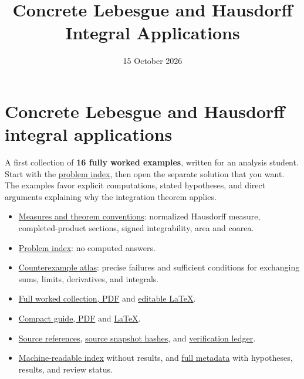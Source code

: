 \documentclass[
  11pt,
]{article}
\title{Concrete Lebesgue and Hausdorff Integral Applications}
\author{}
\date{15 October 2026}
\providecommand{\tightlist}{%
  \setlength{\itemsep}{0pt}\setlength{\parskip}{0pt}}
\begin{document}
\maketitle

{
\hypersetup{linkcolor=}
\setcounter{tocdepth}{3}
\tableofcontents
}
\section{Concrete Lebesgue and Hausdorff integral
applications}\label{start}

A first collection of \textbf{16 fully worked examples}, written for an
analysis student. Start with the \hyperref[problems]{problem index},
then open the separate solution that you want. The examples favor
explicit computations, stated hypotheses, and direct arguments
explaining why the integration theorem applies.

\begin{itemize}
\tightlist
\item
  \hyperref[conventions]{Measures and theorem conventions}: normalized
  Hausdorff measure, completed-product sections, signed integrability,
  area and coarea.
\item
  \hyperref[problems]{Problem index}: no computed answers.
\item
  \hyperref[atlas]{Counterexample atlas}: precise failures and
  sufficient conditions for exchanging sums, limits, derivatives, and
  integrals.
\item
  \href{https://github.com/Drsunflowerherbert/Codex-for-Math/tree/codex/integral-examples-2026-10-15/integral-examples/pdf/integral-examples.pdf}{Full
  worked collection, PDF} and
  \href{https://github.com/Drsunflowerherbert/Codex-for-Math/tree/codex/integral-examples-2026-10-15/integral-examples/pdf/integral-examples.tex}{editable
  LaTeX}.
\item
  \href{https://github.com/Drsunflowerherbert/Codex-for-Math/tree/codex/integral-examples-2026-10-15/integral-examples/pdf/guide.pdf}{Compact
  guide, PDF} and
  \href{https://github.com/Drsunflowerherbert/Codex-for-Math/tree/codex/integral-examples-2026-10-15/integral-examples/pdf/guide.tex}{LaTeX}.
\item
  \hyperref[bibliography]{Source references},
  \href{https://github.com/Drsunflowerherbert/Codex-for-Math/tree/codex/integral-examples-2026-10-15/integral-examples/checks/source-references.json}{source
  snapshot hashes}, and \hyperref[verification]{verification ledger}.
\item
  \href{https://github.com/Drsunflowerherbert/Codex-for-Math/tree/codex/integral-examples-2026-10-15/integral-examples/index.json}{Machine-readable
  index} without results, and
  \href{https://github.com/Drsunflowerherbert/Codex-for-Math/tree/codex/integral-examples-2026-10-15/integral-examples/metadata.json}{full
  metadata} with hypotheses, results, and review status.
\end{itemize}
\end{document}
